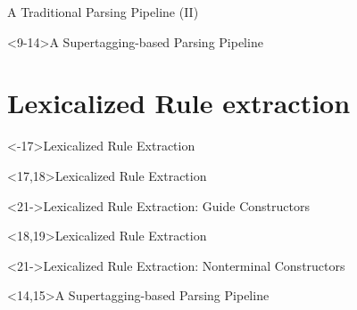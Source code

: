 \documentclass[aspectratio=169, 10pt]{beamer}
\begin{document}
    \begin{frame}{A Traditional Parsing Pipeline (II)}
        \centering
        
    \end{frame}

    \begin{frame}<9-14>{A Supertagging-based Parsing Pipeline \citep{bangalore1999supertagging}}
        \resizebox{\linewidth}{!}{}
    \end{frame}


    \section{Lexicalized Rule extraction}
    \begin{frame}<-17>{Lexicalized Rule Extraction \citep{Rup22}}
        \resizebox{\linewidth}{!}{}
    \end{frame}


    \begin{frame}<17,18>{Lexicalized Rule Extraction}
    \resizebox{\linewidth}{!}{}
    \end{frame}

    \begin{frame}<21->{Lexicalized Rule Extraction: Guide Constructors}
        \resizebox{!}{\paperheight}{}
    \end{frame}

    \begin{frame}<18,19>{Lexicalized Rule Extraction}
        \resizebox{\linewidth}{!}{}
    \end{frame}

    \begin{frame}<21->{Lexicalized Rule Extraction: Nonterminal Constructors}
        \resizebox{\linewidth}{!}{}
    \end{frame}


    \begin{frame}<14,15>{A Supertagging-based Parsing Pipeline}
        \resizebox{\linewidth}{!}{}
    \end{frame}
\end{document}
